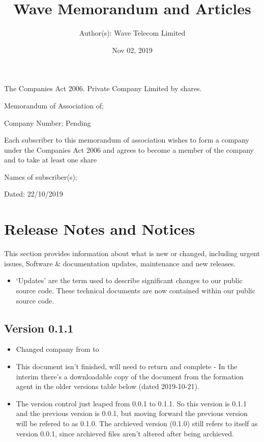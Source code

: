 \documentclass[letterpaper,10pt,openany,oneside,english]{sphinxmanual}
\title{Wave Memorandum and Articles}
\date{Nov 02, 2019}
\author{Author(s): Wave Telecom Limited}
\begin{document}
\maketitle
\sphinxtableofcontents
{}\label{\detokenize{index::doc}}


The Companies Act 2006. Private Company Limited by shares.

Memorandum of Association of; 

Company Number; Pending

Each subscriber to this memorandum of association wishes to form a company under the Companies Act 2006 and agrees to become a member of the company and to take at least one share

Names of subscriber(s); 

Dated: 22/10/2019


\chapter{Release Notes and Notices}
\label{\detokenize{releasenotes:release-notes-and-notices}}\label{\detokenize{releasenotes::doc}}
This section provides information about what is new or changed, including urgent issues, Software \& documentation updates, maintenance and new releases.
\begin{itemize}
\item {} 
‘Updates’ are the term used to describe significant changes to our public source code. These technical documents are now contained within our public source code.

\end{itemize}


\section{Version 0.1.1}
\label{\detokenize{releasenotes:version-0-1-1}}\begin{itemize}
\item {} 
Changed company from  to 

\item {} 
This document isn’t finished, will need to return and complete - In the interim there’s a downloadable copy of the document from the formation agent in the older versions table below (dated 2019-10-21).

\item {} 
The version control just leaped from 0.0.1 to 0.1.1. So this version is 0.1.1 and the previous version is 0.0.1, but moving forward the previous version will be refered to as 0.1.0. The archieved version (0.1.0) still refers to itself as version 0.0.1, since archieved files aren’t altered after being archieved.

\end{itemize}
\end{document}

